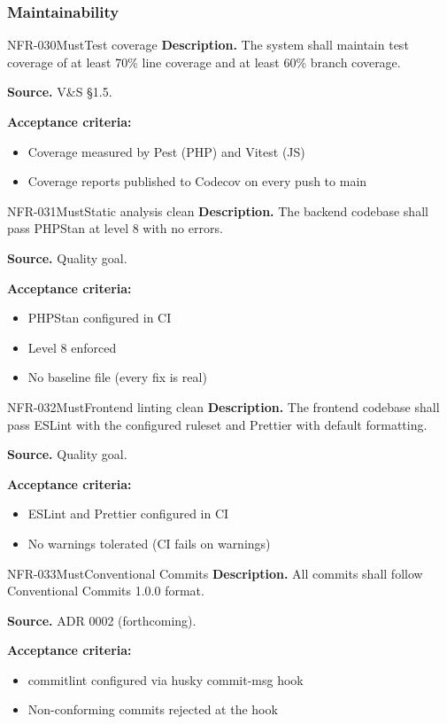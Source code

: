 \documentclass[11pt,a4paper]{article}
\begin{document}
\subsubsection{Maintainability}

\begin{requirement}{NFR-030}{Must}{Test coverage}
\textbf{Description.} The system shall maintain test coverage of at least 70\% line coverage and at least 60\% branch coverage.

\textbf{Source.} V\&S \S1.5.

\textbf{Acceptance criteria:}
\begin{itemize}
    \item Coverage measured by Pest (PHP) and Vitest (JS)
    \item Coverage reports published to Codecov on every push to main
\end{itemize}
\end{requirement}

\begin{requirement}{NFR-031}{Must}{Static analysis clean}
\textbf{Description.} The backend codebase shall pass PHPStan at level 8 with no errors.

\textbf{Source.} Quality goal.

\textbf{Acceptance criteria:}
\begin{itemize}
    \item PHPStan configured in CI
    \item Level 8 enforced
    \item No baseline file (every fix is real)
\end{itemize}
\end{requirement}

\begin{requirement}{NFR-032}{Must}{Frontend linting clean}
\textbf{Description.} The frontend codebase shall pass ESLint with the configured ruleset and Prettier with default formatting.

\textbf{Source.} Quality goal.

\textbf{Acceptance criteria:}
\begin{itemize}
    \item ESLint and Prettier configured in CI
    \item No warnings tolerated (CI fails on warnings)
\end{itemize}
\end{requirement}

\begin{requirement}{NFR-033}{Must}{Conventional Commits}
\textbf{Description.} All commits shall follow Conventional Commits 1.0.0 format.

\textbf{Source.} ADR 0002 (forthcoming).

\textbf{Acceptance criteria:}
\begin{itemize}
    \item commitlint configured via husky commit-msg hook
    \item Non-conforming commits rejected at the hook
\end{itemize}
\end{requirement}
\end{document}

